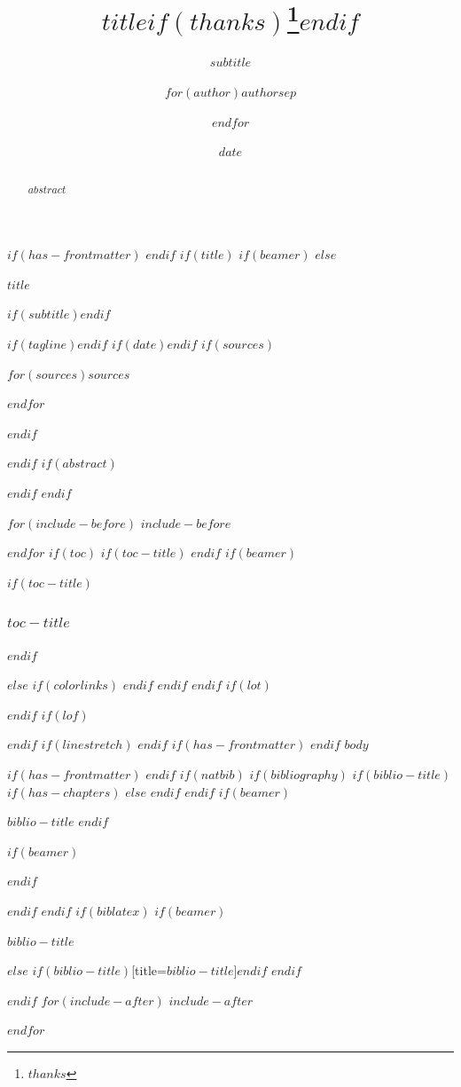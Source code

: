 \documentclass[
$if(fontsize)$
  $fontsize$,
$endif$
$if(lang)$
  $babel-lang$,
$endif$
$if(papersize)$
  $papersize$paper,
$endif$
$if(beamer)$
  ignorenonframetext,
$if(handout)$
  handout,
$endif$
$if(aspectratio)$
  aspectratio=$aspectratio$,
$endif$
$endif$
$for(classoption)$
  $classoption$$sep$,
$endfor$
]{$documentclass$}
\title{$title$$if(thanks)$\thanks{$thanks$}$endif$}
\subtitle{$subtitle$}
\author{$for(author)$$author$$sep$ \and $endfor$}
\date{$date$}
\institute{$for(institute)$$institute$$sep$ \and $endfor$}
\newif\ifbibliography
\begin{document}
$if(has-frontmatter)$
\frontmatter
$endif$
$if(title)$
$if(beamer)$
\frame{\titlepage}
$else$
\begingroup
\centering
\vspace*{1.5in}

{\sffamily\bfseries\color{titlenavy}\fontsize{30}{34}\selectfont $title$\par}
$if(subtitle)$$endif$
\vspace{12pt}{\color{rulegray}\rule{0.86\textwidth}{0.6pt}}\par
$if(tagline)$$endif$
$if(date)$$endif$
$if(sources)$\vspace{6pt}
{\color{bodygray}\footnotesize $for(sources)$$sources$\par $endfor$}$endif$
\par\endgroup
\clearpage
$endif$
$if(abstract)$
\begin{abstract}
$abstract$
\end{abstract}
$endif$
$endif$

$for(include-before)$
$include-before$

$endfor$
$if(toc)$
$if(toc-title)$
\renewcommand*\contentsname{$toc-title$}
$endif$
$if(beamer)$
\begin{frame}[allowframebreaks]
$if(toc-title)$
  \frametitle{$toc-title$}
$endif$
  \tableofcontents[hideallsubsections]
\end{frame}
$else$
{
$if(colorlinks)$
\hypersetup{linkcolor=$if(toccolor)$$toccolor$$else$$endif$}
$endif$
\setcounter{tocdepth}{$toc-depth$}
\tableofcontents
}
\clearpage
$endif$
$endif$
$if(lot)$
\listoftables
$endif$
$if(lof)$
\listoffigures
$endif$
$if(linestretch)$
$endif$
$if(has-frontmatter)$
\mainmatter
$endif$
$body$

$if(has-frontmatter)$
\backmatter
$endif$
$if(natbib)$
$if(bibliography)$
$if(biblio-title)$
$if(has-chapters)$
\renewcommand\bibname{$biblio-title$}
$else$
\renewcommand\refname{$biblio-title$}
$endif$
$endif$
$if(beamer)$
\begin{frame}[allowframebreaks]{$biblio-title$}
  \bibliographytrue
$endif$
  
$if(beamer)$
\end{frame}
$endif$

$endif$
$endif$
$if(biblatex)$
$if(beamer)$
\begin{frame}[allowframebreaks]{$biblio-title$}
  \bibliographytrue
  \printbibliography[heading=none]
\end{frame}
$else$
\printbibliography$if(biblio-title)$[title=$biblio-title$]$endif$
$endif$

$endif$
$for(include-after)$
$include-after$

$endfor$
\end{document}
